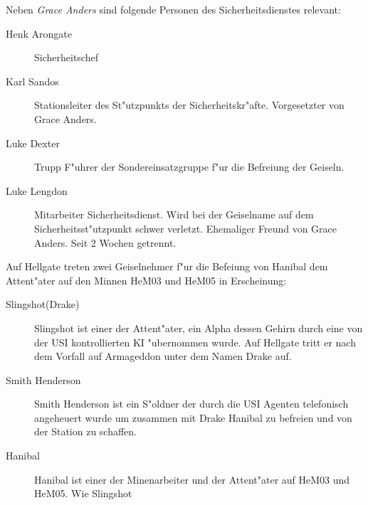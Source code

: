 
Neben \emph{Grace Anders} sind folgende Personen des Sicherheitsdienstes relevant:

\begin{description}
    \item[Henk Arongate] Sicherheitschef    
    \item[Karl Sandos] Stationsleiter des St"utzpunkts der Sicherheitskr"afte. Vorgesetzter von Grace Anders.
    \item[Luke Dexter] Trupp F"uhrer der Sondereinsatzgruppe f"ur die Befreiung der Geiseln.
    \item[Luke Lengdon] Mitarbeiter Sicherheitsdienst. Wird bei der Geiselname auf dem Sicherheitsst"utzpunkt schwer 
        verletzt. Ehemaliger Freund von Grace Anders. Seit 2 Wochen getrennt.
\end{description}


Auf Hellgate treten zwei Geiselnehmer f"ur die Befeiung von Hanibal dem Attent"ater auf den Minnen HeM03 und HeM05 in
Erscheinung:

\begin{description}
    \item[Slingshot(Drake)] Slingshot ist einer der Attent"ater, ein Alpha dessen Gehirn durch eine von der USI 
        kontrollierten KI "ubernommen wurde. Auf Hellgate tritt er nach dem Vorfall auf Armageddon unter dem Namen Drake auf.
    \item[Smith Henderson] Smith Henderson ist ein S"oldner der durch die USI Agenten telefonisch angeheuert wurde um 
        zusammen mit Drake Hanibal zu befreien und von der Station zu schaffen.
    \item[Hanibal] Hanibal ist einer der Minenarbeiter und der Attent"ater auf HeM03 und HeM05. Wie Slingshot 
\end{description}

